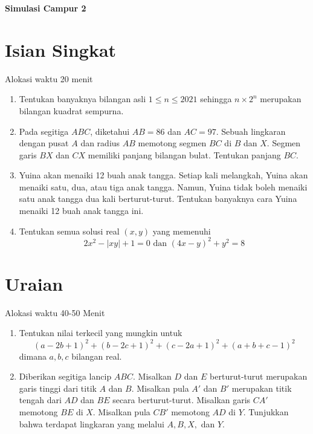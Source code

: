 \documentclass[12pt]{scrartcl}
\begin{document}
\renewcommand*\contentsname{Daftar Isi}
\tableofcontents

\newpage
	\textbf{\Large Simulasi Campur 2}
	
	\section{Isian Singkat}
	Alokasi waktu 20 menit
	\begin{enumerate}
		\item Tentukan banyaknya bilangan asli $1 \le n \le 2021$ sehingga $n\times2^n$ merupakan bilangan kuadrat sempurna.
		
		\item Pada segitiga $ABC$, diketahui $AB=86$ dan $AC=97$. Sebuah lingkaran dengan pusat $A$ dan radius $AB$ memotong segmen $BC$ di $B$ dan $X$. Segmen garis $BX$ dan $CX$ memiliki panjang bilangan bulat. Tentukan panjang $BC$.
		
		\item Yuina akan menaiki 12 buah anak tangga. Setiap kali melangkah, Yuina akan menaiki satu, dua, atau tiga anak tangga. Namun, Yuina tidak boleh menaiki satu anak tangga dua kali berturut-turut. Tentukan banyaknya cara Yuina menaiki 12 buah anak tangga ini.
		
		
		
		\item Tentukan semua solusi real $(x,y)$ yang memenuhi $$2x^2-|xy|+1=0 \text{ dan } (4x-y)^2+y^2=8$$
		
	\end{enumerate}


\section{Uraian}
Alokasi waktu 40-50 Menit
\begin{enumerate}[resume]
		\item Tentukan nilai terkecil yang mungkin untuk $$(a-2b+1)^2+(b-2c+1)^2+(c-2a+1)^2+(a+b+c-1)^2$$ dimana $a,b,c$ bilangan real.
		
		\item Diberikan segitiga lancip $ABC$. Misalkan $D$ dan $E$ berturut-turut merupakan garis tinggi dari titik $A$ dan $B$. Misalkan pula $A'$ dan $B'$ merupakan titik tengah dari $AD$ dan $BE$ secara berturut-turut. Misalkan garis $CA'$ memotong $BE$ di $X$. Misalkan pula $CB'$ memotong $AD$ di $Y$. Tunjukkan bahwa terdapat lingkaran yang melalui $A,B,X,$ dan $Y$.
\end{enumerate}
\end{document}
